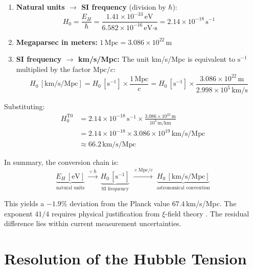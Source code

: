	\begin{enumerate}
		\item \textbf{Natural units $\rightarrow$ SI frequency} (division by $\hbar$):
		\begin{equation*}
			H_0 = \frac{E_H}{\hbar} = \frac{1.41 \times 10^{-33}\,\text{eV}}{6.582 \times 10^{-16}\,\text{eV·s}} = 2.14 \times 10^{-18}\,\text{s}^{-1}
		\end{equation*}
		\item \textbf{Megaparsec in meters:} $1\,\text{Mpc} = 3.086 \times 10^{22}\,\text{m}$
		\item \textbf{SI frequency $\rightarrow$ km/s/Mpc:} The unit km/s/Mpc is equivalent to $\text{s}^{-1}$ multiplied by the factor $\text{Mpc}/c$:
		\begin{equation*}
			H_0\,[\text{km/s/Mpc}] = H_0\,[\text{s}^{-1}] \times \frac{1\,\text{Mpc}}{c} = H_0\,[\text{s}^{-1}] \times \frac{3.086 \times 10^{22}\,\text{m}}{2.998 \times 10^{5}\,\text{km/s}}
		\end{equation*}
	\end{enumerate}
	
	Substituting:
	\begin{align*}
		H_0^{\text{T0}} &= 2.14 \times 10^{-18}\,\text{s}^{-1} \times \frac{3.086 \times 10^{22}\,\text{m}}{10^3\,\text{m/km}} \\
		&= 2.14 \times 10^{-18} \times 3.086 \times 10^{19}\,\text{km/s/Mpc} \\
		&\approx 66.2\,\text{km/s/Mpc}
	\end{align*}
	
	In summary, the conversion chain is:
	\begin{equation}
		\underbrace{E_H\,[\text{eV}]}_{\text{natural units}} \;\xrightarrow{\div\,\hbar}\; \underbrace{H_0\,[\text{s}^{-1}]}_{\text{SI frequency}} \;\xrightarrow{\times\,\text{Mpc}/c}\; \underbrace{H_0\,[\text{km/s/Mpc}]}_{\text{astronomical convention}}
	\end{equation}
	
	This yields a $-1.9\%$ deviation from the Planck value $67.4\,$km/s/Mpc. The exponent $41/4$ requires physical justification from $\xi$-field theory \cite{riess2019}. The residual difference lies within current measurement uncertainties.
	
	\section{Resolution of the Hubble Tension}
	
